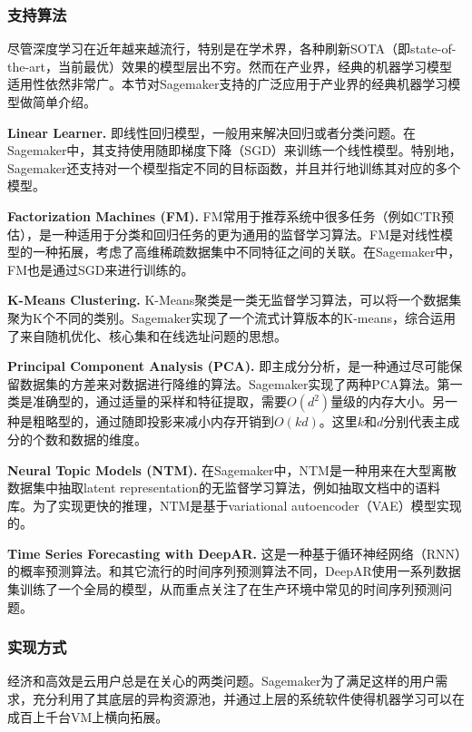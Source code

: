 \subsubsection{支持算法}
尽管深度学习在近年越来越流行，特别是在学术界，各种刷新SOTA（即state-of-the-art，当前最优）效果的模型层出不穷。然而在产业界，经典的机器学习模型适用性依然非常广。本节对Sagemaker支持的广泛应用于产业界的经典机器学习模型做简单介绍。

\textbf{Linear Learner. }即线性回归模型，一般用来解决回归或者分类问题。在Sagemaker中，其支持使用随即梯度下降（SGD）来训练一个线性模型。特别地，Sagemaker还支持对一个模型指定不同的目标函数，并且并行地训练其对应的多个模型。

\textbf{Factorization Machines (FM). }\parencite{rendle2010factorization}FM常用于推荐系统中很多任务（例如CTR预估），是一种适用于分类和回归任务的更为通用的监督学习算法。FM是对线性模型的一种拓展，考虑了高维稀疏数据集中不同特征之间的关联。在Sagemaker中，FM也是通过SGD来进行训练的。

\textbf{K-Means Clustering. }\parencite{jain2010data}K-Means聚类是一类无监督学习算法，可以将一个数据集聚为K个不同的类别。Sagemaker实现了一个流式计算版本的K-means，综合运用了来自随机优化、核心集和在线选址问题的思想。

\textbf{Principal Component Analysis (PCA). }\parencite{tenenbaum2000a}即主成分分析，是一种通过尽可能保留数据集的方差来对数据进行降维的算法。Sagemaker实现了两种PCA算法。第一类是准确型的，通过适量的采样和特征提取，需要$O(d^2)$量级的内存大小。另一种是粗略型的，通过随即投影来减小内存开销到$O(kd)$。这里$k$和$d$分别代表主成分的个数和数据的维度。

\textbf{Neural Topic Models (NTM). }在Sagemaker中，NTM是一种用来在大型离散数据集中抽取latent representation的无监督学习算法，例如抽取文档中的语料库。为了实现更快的推理，NTM是基于variational autoencoder（VAE）模型实现的。

\textbf{Time Series Forecasting with DeepAR. }这是一种基于循环神经网络（RNN）的概率预测算法。和其它流行的时间序列预测算法不同，DeepAR\parencite{flunkert2020deepar}使用一系列数据集训练了一个全局的模型，从而重点关注了在生产环境中常见的时间序列预测问题。

\subsubsection{实现方式}
经济和高效是云用户总是在关心的两类问题。Sagemaker为了满足这样的用户需求，充分利用了其底层的异构资源池，并通过上层的系统软件使得机器学习可以在成百上千台VM上横向拓展。


